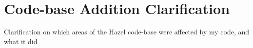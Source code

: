 \chapter{Code-base Addition Clarification}
Clarification on which areas of the Hazel code-base were affected by my code, and what it did